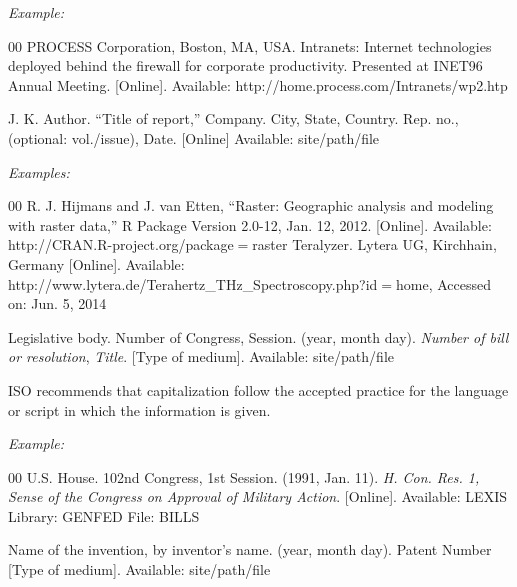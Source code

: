 \documentclass{ieeetj}
\begin{document}
{\it Example:}

\begin{thebibliography}{00}
 PROCESS Corporation, Boston, MA, USA. Intranets: Internet technologies deployed behind the firewall for corporate productivity. Presented at INET96 Annual Meeting. [Online]. Available:  {http://home.process.com/Intranets/wp2.htp}
\end{thebibliography}


\noindent J. K. Author. ``Title of report,'' Company. City, State, Country. Rep. no.,
(optional: vol./issue), Date. [Online] Available:
{site/path/file}

{\it Examples:}

\begin{thebibliography}{00}
 R. J. Hijmans and J. van Etten, ``Raster: Geographic analysis and modeling with raster data,'' R Package Version 2.0-12, Jan. 12, 2012. [Online]. Available:  {http://CRAN.R-project.org/package$=$raster} {}
 Teralyzer. Lytera UG, Kirchhain, Germany [Online]. Available: http://www.lytera.de/Terahertz\_THz\_Spectroscopy.php?id$=$home, Accessed on: Jun. 5, 2014
\end{thebibliography}


\noindent Legislative body. Number of Congress, Session. (year, month day). {\it Number of bill or resolution}, {\it Title}. [Type
of medium]. Available: site/path/file

 ISO recommends that capitalization follow the accepted
practice for the language or script in which the information is given.



{\it Example:}

\begin{thebibliography}{00}
 U.S. House. 102nd Congress, 1st Session. (1991, Jan. 11). {\it H. Con. Res. 1, Sense of the Congress on Approval of Military Action}. [Online]. Available: LEXIS Library: GENFED File: BILLS
\end{thebibliography}


\noindent Name of the invention, by inventor's name. (year, month day). Patent Number  [Type
of medium]. Available:  {site/path/file}
\end{document}
